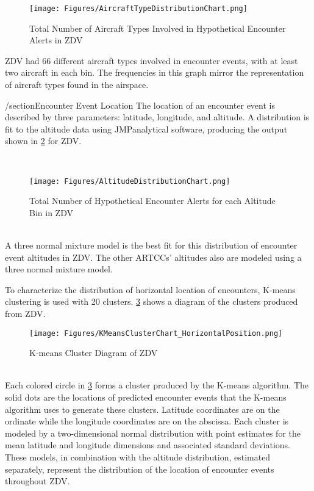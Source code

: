 \begin{figure}[H]
\centering
\texttt{[image: Figures/AircraftTypeDistributionChart.png]}
\caption{Total Number of Aircraft Types Involved in Hypothetical Encounter Alerts in ZDV}
\label{fig:aircraftchart}
\end{figure}

ZDV had 66 different aircraft types involved in encounter events, with at least two aircraft in each bin. The frequencies in this graph mirror the representation of aircraft types found in the airspace. 

/section{Encounter Event Location}
The location of an encounter event is described by three parameters: latitude, longitude, and altitude. A distribution is fit to the altitude data using JMP\textregistered analytical software, producing the output shown in \ref{fig:altitudechart} for ZDV.

~\\
\begin{figure}[H]
\centering
\texttt{[image: Figures/AltitudeDistributionChart.png]}
\caption{Total Number of Hypothetical Encounter Alerts for each Altitude Bin in ZDV}
\label{fig:altitudechart}
\end{figure}
~\\

A three normal mixture model is the best fit for this distribution of encounter event altitudes in ZDV. The other ARTCCs’ altitudes also are modeled using a three normal mixture model.

To characterize the distribution of horizontal location of encounters, K-means clustering is used with 20 clusters. \ref{fig:kmeanschart} shows a diagram of the clusters produced from ZDV.

\begin{figure}[H]
\centering
\texttt{[image: Figures/KMeansClusterChart\_HorizontalPosition.png]}
\caption{K-means Cluster Diagram of ZDV}
\label{fig:kmeanschart}
\end{figure}
~\\

Each colored circle in \ref{fig:kmeanschart} forms a cluster produced by the K-means algorithm. The solid dots are the locations of predicted encounter events that the K-means algorithm uses to generate these clusters. Latitude coordinates are on the ordinate while the longitude coordinates are on the abscissa. Each cluster is modeled by a two-dimensional normal distribution with point estimates for the mean latitude and longitude dimensions and associated standard deviations. These models, in combination with the altitude distribution, estimated separately, represent the distribution of the location of encounter events throughout ZDV. 